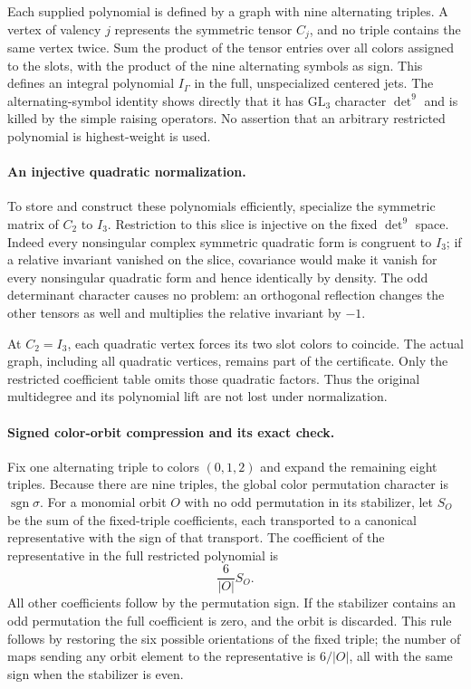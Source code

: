 Each supplied polynomial is defined by a graph with nine alternating
triples.  A vertex of valency $j$ represents the symmetric tensor
$C_j$, and no triple contains the same vertex twice.  Sum the product
of the tensor entries over all colors assigned to the slots, with
the product of the nine alternating symbols as sign.  This defines
an integral polynomial $I_\Gamma$ in the full, unspecialized centered
jets.  The alternating-symbol identity shows directly that it has
$\mathrm{GL}_3$ character $\det^9$ and is killed by the simple raising
operators.  No assertion that an arbitrary restricted polynomial is
highest-weight is used.

\paragraph{An injective quadratic normalization.}
To store and construct these polynomials efficiently, specialize the
symmetric matrix of $C_2$ to $I_3$.  Restriction to this slice is
injective on the fixed $\det^9$ space.  Indeed every nonsingular
complex symmetric quadratic form is congruent to $I_3$; if a relative
invariant vanished on the slice, covariance would make it vanish for
every nonsingular quadratic form and hence identically by density.
The odd determinant character causes no problem: an orthogonal
reflection changes the other tensors as well and multiplies the
relative invariant by $-1$.

At $C_2=I_3$, each quadratic vertex forces its two slot colors to
coincide.  The actual graph, including all quadratic vertices, remains
part of the certificate.  Only the restricted coefficient table omits
those quadratic factors.  Thus the original multidegree and its
polynomial lift are not lost under normalization.

\paragraph{Signed color-orbit compression and its exact check.}
Fix one alternating triple to colors $(0,1,2)$ and expand the remaining
eight triples.  Because there are nine triples, the global color
permutation character is $\operatorname{sgn}\sigma$.  For a monomial
orbit $O$ with no odd permutation in its stabilizer, let $S_O$ be the
sum of the fixed-triple coefficients, each transported to a canonical
representative with the sign of that transport.  The coefficient of
the representative in the full restricted polynomial is
\[
                              \frac6{|O|}S_O.
\]
All other coefficients follow by the permutation sign.  If the
stabilizer contains an odd permutation the full coefficient is zero,
and the orbit is discarded.  This rule follows by restoring the six
possible orientations of the fixed triple; the number of maps sending
any orbit element to the representative is $6/|O|$, all with the same
sign when the stabilizer is even.

